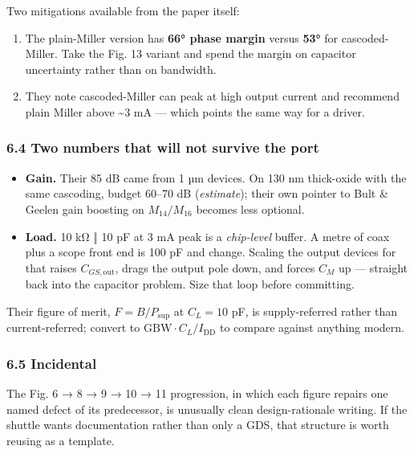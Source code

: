 \documentclass[
  10pt,
  a4paper,
]{article}
\providecommand{\tightlist}{%
  \setlength{\itemsep}{0pt}\setlength{\parskip}{0pt}}
\begin{document}
Two mitigations available from the paper itself:

\begin{enumerate}
\def\labelenumi{\arabic{enumi}.}
\tightlist
\item
  The plain-Miller version has \textbf{66° phase margin} versus
  \textbf{53°} for cascoded-Miller. Take the Fig. 13 variant and spend
  the margin on capacitor uncertainty rather than on bandwidth.
\item
  They note cascoded-Miller can peak at high output current and
  recommend plain Miller above \textasciitilde3 mA --- which points the
  same way for a driver.
\end{enumerate}

\hypertarget{two-numbers-that-will-not-survive-the-port}{%
\subsubsection{6.4 Two numbers that will not survive the
port}\label{two-numbers-that-will-not-survive-the-port}}

\begin{itemize}
\tightlist
\item
  \textbf{Gain.} Their 85 dB came from 1 µm devices. On 130 nm
  thick-oxide with the same cascoding, budget 60--70 dB
  (\emph{estimate}); their own pointer to Bult \& Geelen gain boosting
  on \(M_{14}/M_{16}\) becomes less optional.
\item
  \textbf{Load.} 10 kΩ ‖ 10 pF at 3 mA peak is a \emph{chip-level}
  buffer. A metre of coax plus a scope front end is 100 pF and change.
  Scaling the output devices for that raises \(C_{GS,\mathrm{out}}\),
  drags the output pole down, and forces \(C_M\) up --- straight back
  into the capacitor problem. Size that loop before committing.
\end{itemize}

Their figure of merit, \(F = B/P_\mathrm{sup}\) at \(C_L = 10\) pF, is
supply-referred rather than current-referred; convert to
\(\mathrm{GBW}\cdot C_L/I_\mathrm{DD}\) to compare against anything
modern.

\hypertarget{incidental}{%
\subsubsection{6.5 Incidental}\label{incidental}}

The Fig. 6 → 8 → 9 → 10 → 11 progression, in which each figure repairs
one named defect of its predecessor, is unusually clean design-rationale
writing. If the shuttle wants documentation rather than only a GDS, that
structure is worth reusing as a template.
\end{document}
